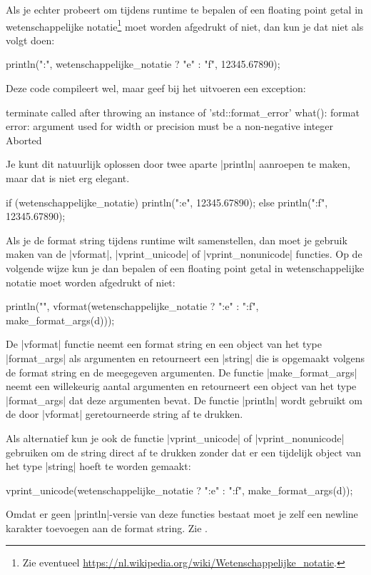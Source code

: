 \begin{cpplstShortInline}
Als je echter probeert om tijdens runtime te bepalen of een floating point getal in wetenschappelijke notatie\footnote{%
	Zie eventueel \url{https://nl.wikipedia.org/wiki/Wetenschappelijke_notatie}.
} moet worden afgedrukt of niet, dan kun je dat niet als volgt doen:
\begin{cpplstfragment}
    println("{:{}}", wetenschappelijke_notatie ? "e" : "f", 12345.67890);
\end{cpplstfragment}
	Deze code compileert wel, maar geef bij het uitvoeren een exception:
\begin{lstfragment}
terminate called after throwing an instance of 'std::format_error'
 what():  format error: argument used for width or precision must be a non-negative integer
Aborted
\end{lstfragment}
Je kunt dit natuurlijk oplossen door twee aparte |println| aanroepen te maken, maar dat is niet erg elegant.
\begin{cpplstfragment}
    if (wetenschappelijke_notatie) {
        println("{:e}", 12345.67890);
    } else {
        println("{:f}", 12345.67890);
    }
\end{cpplstfragment}

Als je de format string tijdens runtime wilt samenstellen, dan moet je gebruik maken van de |vformat|, |vprint_unicode| of |vprint_nonunicode| functies.
Op de volgende wijze kun je dan bepalen of een floating point getal in wetenschappelijke notatie moet worden afgedrukt of niet:
\begin{cpplstfragment}
	println("{}", vformat(wetenschappelijke_notatie ? "{:e}" : "{:f}", make_format_args(d)));
\end{cpplstfragment}
De |vformat| functie neemt een format string en een object van het type |format_args| als argumenten en retourneert een |string| die is opgemaakt volgens de format string en de meegegeven argumenten.
De functie |make_format_args| neemt een willekeurig aantal argumenten en retourneert een object van het type |format_args| dat deze argumenten bevat.
De functie |println| wordt gebruikt om de door |vformat| geretourneerde string af te drukken.

Als alternatief kun je ook de functie |vprint_unicode| of |vprint_nonunicode| gebruiken om de string direct af te drukken zonder dat er een tijdelijk object van het type |string| hoeft te worden gemaakt:
\begin{cpplstfragment}
	vprint_unicode(wetenschappelijke_notatie ? "{:e}\n" : "{:f}\n", make_format_args(d));
\end{cpplstfragment}
Omdat er geen |println|-versie van deze functies bestaat moet je zelf een newline karakter toevoegen aan de format string.
Zie .


\end{cpplstShortInline}
